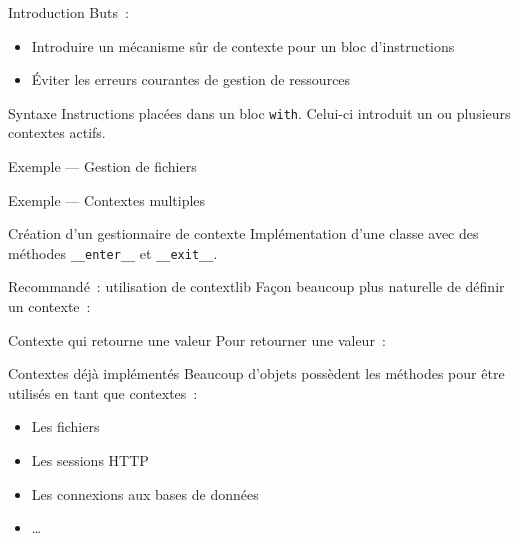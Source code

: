 \begin{frame}{Introduction}
  Buts~:
  \begin{itemize}[<+->]
    \item Introduire un mécanisme sûr de contexte pour un bloc d'instructions
    \item Éviter les erreurs courantes de gestion de ressources
  \end{itemize}
\end{frame}

\begin{frame}{Syntaxe}
  Instructions placées dans un bloc \texttt{with}. Celui-ci introduit un ou plusieurs contextes actifs.  
\end{frame}

\begin{frame}{Exemple --- Gestion de fichiers}
\end{frame}

\begin{frame}{Exemple --- Contextes multiples}
\end{frame}

\begin{frame}{Création d'un gestionnaire de contexte}
  Implémentation d'une classe avec des méthodes \texttt{\_\_enter\_\_} et \texttt{\_\_exit\_\_}.

\end{frame}

\begin{frame}{Recommandé~: utilisation de contextlib}
  Façon beaucoup plus naturelle de définir un contexte~:

\end{frame}

\begin{frame}{Contexte qui retourne une valeur}
  Pour retourner une valeur~:

\end{frame}

\begin{frame}{Contextes déjà implémentés}
  Beaucoup d'objets possèdent les méthodes pour être utilisés en tant que contextes~:
  \begin{itemize}[<+->]
    \item Les fichiers
    \item Les sessions HTTP
    \item Les connexions aux bases de données
    \item …
  \end{itemize}
\end{frame}

